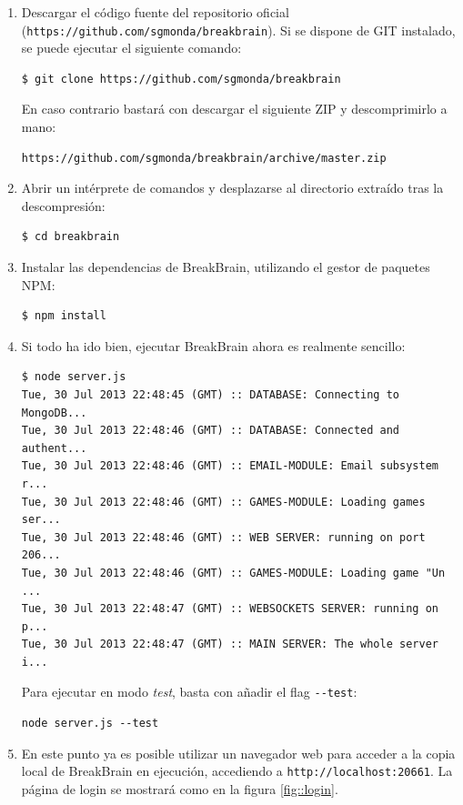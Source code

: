 \begin{enumerate}
\item Descargar el código fuente del repositorio oficial ({\tt https://github.com/sgmonda/breakbrain}). Si se dispone de GIT instalado, se puede ejecutar el siguiente comando:

\begin{verbatim}
$ git clone https://github.com/sgmonda/breakbrain
\end{verbatim}

En caso contrario bastará con descargar el siguiente ZIP y descomprimirlo a mano:

\begin{verbatim}
https://github.com/sgmonda/breakbrain/archive/master.zip
\end{verbatim}

\item Abrir un intérprete de comandos y desplazarse al directorio extraído tras la descompresión:

\begin{verbatim}
$ cd breakbrain
\end{verbatim}

\item Instalar las dependencias de BreakBrain, utilizando el gestor de paquetes NPM:
\begin{verbatim}
$ npm install
\end{verbatim}

\item Si todo ha ido bien, ejecutar BreakBrain ahora es realmente sencillo:
\begin{verbatim}
$ node server.js
Tue, 30 Jul 2013 22:48:45 (GMT) :: DATABASE: Connecting to MongoDB...
Tue, 30 Jul 2013 22:48:46 (GMT) :: DATABASE: Connected and authent...
Tue, 30 Jul 2013 22:48:46 (GMT) :: EMAIL-MODULE: Email subsystem r...
Tue, 30 Jul 2013 22:48:46 (GMT) :: GAMES-MODULE: Loading games ser...
Tue, 30 Jul 2013 22:48:46 (GMT) :: WEB SERVER: running on port 206...
Tue, 30 Jul 2013 22:48:46 (GMT) :: GAMES-MODULE: Loading game "Un ...
Tue, 30 Jul 2013 22:48:47 (GMT) :: WEBSOCKETS SERVER: running on p...
Tue, 30 Jul 2013 22:48:47 (GMT) :: MAIN SERVER: The whole server i...
\end{verbatim}
Para ejecutar en modo {\it test}, basta con añadir el flag \verb|--test|:
\begin{verbatim}
node server.js --test
\end{verbatim}

\item En este punto ya es posible utilizar un navegador web para acceder a la copia local de BreakBrain en ejecución, accediendo a {\tt http://localhost:20661}. La página de login se mostrará como en la figura \ref{fig::login}.


\end{enumerate}
